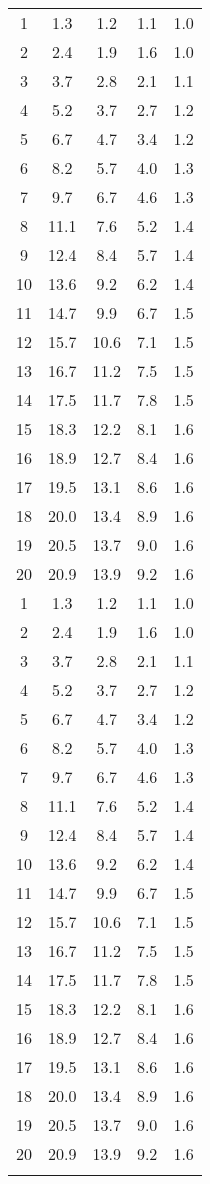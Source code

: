 \begin{center}
\begin{longtable}{*{5}{c}}
		1	& 1.3	& 1.2	& 1.1	& 1.0\\
		2	& 2.4	& 1.9	& 1.6	& 1.0\\
		3	& 3.7	& 2.8	& 2.1	& 1.1\\
		4	& 5.2	& 3.7	& 2.7	& 1.2\\
		5	& 6.7	& 4.7	& 3.4	& 1.2\\
		6	& 8.2	& 5.7	& 4.0	& 1.3\\
		7	& 9.7	& 6.7	& 4.6	& 1.3\\
		8	& 11.1	& 7.6	& 5.2	& 1.4\\
		9	& 12.4	& 8.4	& 5.7	& 1.4\\
		10	& 13.6	& 9.2	& 6.2	& 1.4\\
		11	& 14.7	& 9.9	& 6.7	& 1.5\\
		12	& 15.7	& 10.6	& 7.1	& 1.5\\
		13	& 16.7	& 11.2	& 7.5	& 1.5\\
		14	& 17.5	& 11.7	& 7.8	& 1.5\\
		15	& 18.3	& 12.2	& 8.1	& 1.6\\
		16	& 18.9	& 12.7	& 8.4	& 1.6\\
		17	& 19.5	& 13.1	& 8.6	& 1.6\\
		18	& 20.0	& 13.4	& 8.9	& 1.6\\
		19	& 20.5	& 13.7	& 9.0	& 1.6\\
		20	& 20.9	& 13.9	& 9.2	& 1.6\\
		1	& 1.3	& 1.2	& 1.1	& 1.0\\
		2	& 2.4	& 1.9	& 1.6	& 1.0\\
		3	& 3.7	& 2.8	& 2.1	& 1.1\\
		4	& 5.2	& 3.7	& 2.7	& 1.2\\
		5	& 6.7	& 4.7	& 3.4	& 1.2\\
		6	& 8.2	& 5.7	& 4.0	& 1.3\\
		7	& 9.7	& 6.7	& 4.6	& 1.3\\
		8	& 11.1	& 7.6	& 5.2	& 1.4\\
		9	& 12.4	& 8.4	& 5.7	& 1.4\\
		10	& 13.6	& 9.2	& 6.2	& 1.4\\
		11	& 14.7	& 9.9	& 6.7	& 1.5\\
		12	& 15.7	& 10.6	& 7.1	& 1.5\\
		13	& 16.7	& 11.2	& 7.5	& 1.5\\
		14	& 17.5	& 11.7	& 7.8	& 1.5\\
		15	& 18.3	& 12.2	& 8.1	& 1.6\\
		16	& 18.9	& 12.7	& 8.4	& 1.6\\
		17	& 19.5	& 13.1	& 8.6	& 1.6\\
		18	& 20.0	& 13.4	& 8.9	& 1.6\\
		19	& 20.5	& 13.7	& 9.0	& 1.6\\
		20	& 20.9	& 13.9	& 9.2	& 1.6\\
		\specialrule{0.3pt}{2pt}{2pt}	
		\multicolumn{5}{c}{Source: Author.}
\end{longtable}

\end{center}

\vfill
\setstretch{\taxaespacoduplo}